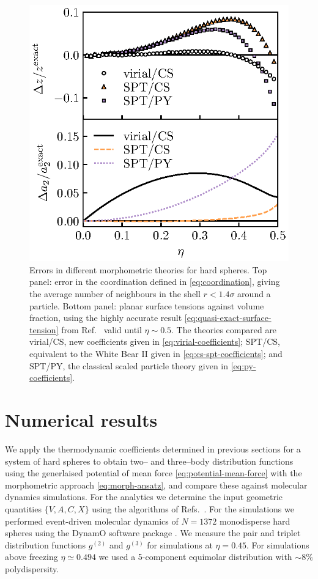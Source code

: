 \documentclass[11pt,twoside]{report}
\begin{document}
\begin{figure}
  \includegraphics[width=0.9\linewidth,outer]{a2-errors}
  \caption[Comparing of theoretical surface tensions against literature values]{
    Errors in different morphometric theories for hard spheres.
    Top panel: error in the coordination defined in \eqref{eq:coordination}, giving the average number of neighbours in the shell $r < 1.4\sigma$ around a particle.
    Bottom panel: planar surface tensions against volume fraction, using the highly accurate result \eqref{eq:quasi-exact-surface-tension} from Ref.\ \cite{DavidchackMP2015} valid until $\eta \sim 0.5$.
  The theories compared are virial/CS, new coefficients given in \eqref{eq:virial-coefficients}; SPT/CS, equivalent to the White Bear II \cite{Hansen-GoosJPCM2006} given in \eqref{eq:cs-spt-coefficients}; and SPT/PY, the classical scaled particle theory \cite{ReissJCP1959} given in \eqref{eq:py-coefficients}.}
  \label{fig:surface-tension}
\end{figure}

\section{Numerical results}
\label{sec:numerics}

We apply the thermodynamic coefficients determined in previous sections for a system of hard spheres to obtain two-- and three--body distribution functions using the generlaised potential of mean force \eqref{eq:potential-mean-force} with the morphometric approach \eqref{eq:morph-ansatz}, and compare these against molecular dynamics simulations.
For the analytics we determine the input geometric quantities $\{V,A,C,X\}$ using the algorithms of Refs.\ \cite{MeckeAA1994,KleninJCC2011}.
For the simulations we performed event-driven molecular dynamics of $N=1372$ monodisperse hard spheres using the DynamO software package \cite{BannermanJCP2010}.
We measure the pair and triplet distribution functions $g^{(2)}$ and $g^{(3)}$ for simulations at $\eta = 0.45$.
For simulations above freezing $\eta \simeq 0.494$ we used a 5-component equimolar distribution with $\sim8\%$ polydispersity.
\end{document}
